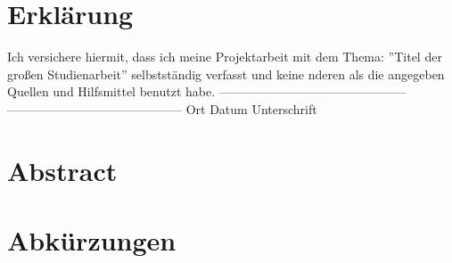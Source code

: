 \documentclass[12pt, a4paper]{scrbook}
\begin{document}

\setlength{\parindent}{0em} 
\let\cleardoublepage\relax





\section*{Erklärung}
Ich versichere hiermit, dass ich meine Projektarbeit mit dem Thema: ''Titel der großen Studienarbeit'' selbstständig verfasst und keine nderen als die angegeben Quellen und Hilfsmittel benutzt habe.
\newline
\newline
\newline
\newline
---------------------------------------------       ------------------------------------------ \newline
Ort	\hspace{2cm}		Datum\hspace{3,5 cm}				    Unterschrift
\newpage
\section*{Abstract}
\newpage
\begingroup
\renewcommand*{\chapterpagestyle}{empty}
\pagestyle{empty}
\tableofcontents
\listoffigures

\section*{Abkürzungen}

\begin{acronym}[Bash]
\end{acronym}
\endgroup
\newpage
\pagestyle{plain}
\setcounter{page}{1}
\end{document}
